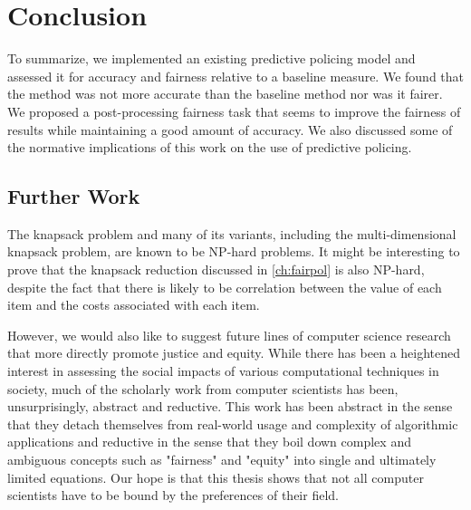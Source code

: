 \chapter{Conclusion}\label{ch:conclusion}


To summarize, we implemented an existing predictive policing model and assessed it for accuracy and fairness relative to a baseline measure. We found that the method was not more accurate than the baseline method nor was it fairer. We proposed a post-processing fairness task that seems to improve the fairness of results while maintaining a good amount of accuracy. We also discussed some of the normative implications of this work on the use of predictive policing.

\section{Further Work}
The knapsack problem and many of its variants, including the multi-dimensional knapsack problem, are known to be NP-hard problems. It might be interesting to prove that the knapsack reduction discussed in \autoref{ch:fairpol} is also NP-hard, despite the fact that there is likely to be correlation between the value of each item and the costs associated with each item.

However, we would also like to suggest future lines of computer science research that more directly promote justice and equity. While there has been a heightened interest in assessing the social impacts of various computational techniques in society, much of the scholarly work from computer scientists has been, unsurprisingly, abstract and reductive. This work has been abstract in the sense that they detach themselves from real-world usage and complexity of algorithmic applications and reductive in the sense that they boil down complex and ambiguous concepts such as "fairness" and "equity" into single and ultimately limited equations. Our hope is that this thesis shows that not all computer scientists have to be bound by the preferences of their field.

